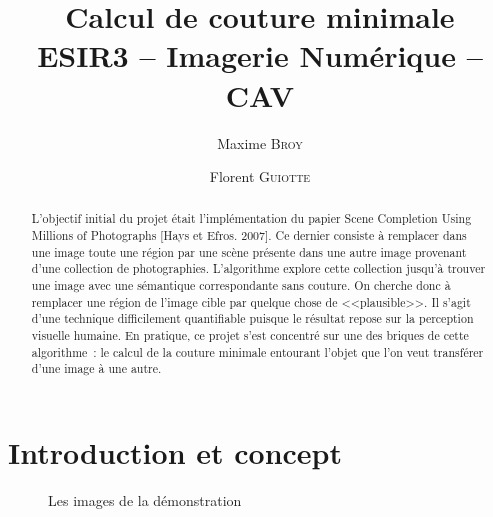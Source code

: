 \documentclass[a4paper]{article}
\title{Calcul de couture minimale \\ {\large ESIR3 -- Imagerie Numérique -- CAV}}
\author{Maxime \textsc{Broy} \and Florent \textsc{Guiotte}}
\begin{document}
\maketitle 
\begin{abstract}
L'objectif initial du projet était l'implémentation du papier Scene Completion Using Millions of Photographs [Hays et Efros. 2007]. 
Ce dernier consiste à remplacer dans une image toute une région par une scène présente dans une autre image provenant d'une collection de photographies. 
L'algorithme explore cette collection jusqu'à trouver une image avec une sémantique correspondante sans couture.
On cherche donc à remplacer une région de l'image cible par quelque chose de <<plausible>>. 
Il s'agit d'une technique difficilement quantifiable puisque le résultat repose sur la perception visuelle humaine. 
En pratique, ce projet s'est concentré sur une des briques de cette algorithme~: 
le calcul de la couture minimale entourant l'objet que l'on veut transférer d'une image à une autre. 
\end{abstract}

\tableofcontents

\section{Introduction et concept}               

\begin{figure}[!ht]%
    \centering
    \hspace{0.030\textwidth}
    \caption{Les images de la démonstration}
    \label{pres}
\end{figure}
\end{document}
